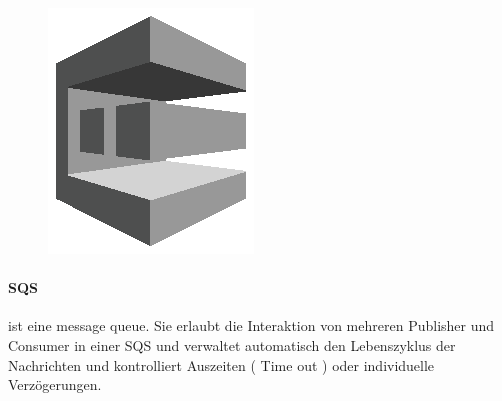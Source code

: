\documentclass[
12pt,
english,
ngerman,
headsepline,
twoside,
openright,
numbers=noenddot,version=first
]{scrreprt}
\begin{document}
\begin{figure}
	\includegraphics[width=0.9\linewidth]{./pics/aws/Messaging_GRAYSCALE_AmazonSQS.eps}
\end{figure}
\paragraph{\acrfull{SQS}}\label{par:sqs} ist eine message queue. Sie erlaubt die Interaktion von mehreren Publisher und Consumer in einer \acrshort{SQS} und verwaltet automatisch den Lebenszyklus der Nachrichten und kontrolliert Auszeiten ( Time out ) oder individuelle Verzögerungen.
\end{document}
